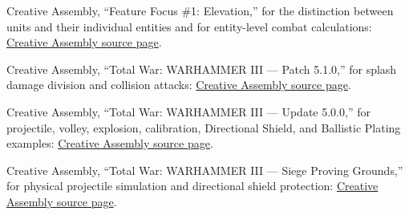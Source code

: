 \documentclass[11pt]{article}
\begin{document}
Creative Assembly, ``Feature Focus \#1: Elevation,'' for the distinction
between units and their individual entities and for entity-level combat
calculations:
\href{https://community.creative-assembly.com/total-war/total-war-warhammer/blogs/11-feature-focus-1-elevation}{Creative Assembly source page}.

Creative Assembly, ``Total War: WARHAMMER III --- Patch 5.1.0,'' for splash
damage division and collision attacks:
\href{https://community.creative-assembly.com/total-war/total-war-warhammer/blogs/23-total-war-warhammer-iii-patch-5-1-0}{Creative Assembly source page}.

Creative Assembly, ``Total War: WARHAMMER III --- Update 5.0.0,'' for
projectile, volley, explosion, calibration, Directional Shield, and Ballistic
Plating examples:
\href{https://community.creative-assembly.com/total-war/total-war-warhammer/blogs/17-total-war-warhammer-iii-update-5-0-0}{Creative Assembly source page}.

Creative Assembly, ``Total War: WARHAMMER III --- Siege Proving Grounds,''
for physical projectile simulation and directional shield protection:
\href{https://community.creative-assembly.com/total-war/total-war-warhammer/blogs/76}{Creative Assembly source page}.
\end{document}
